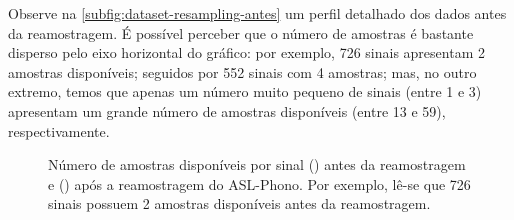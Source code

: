 Observe na \autoref{subfig:dataset-resampling-antes} um perfil detalhado dos dados antes da reamostragem. É possível perceber que o número de amostras é bastante disperso pelo eixo horizontal do gráfico: por exemplo, 726 sinais apresentam 2 amostras disponíveis; seguidos por 552 sinais com 4 amostras; mas, no outro extremo, temos que apenas um número muito pequeno de sinais (entre 1 e 3) apresentam um grande número de amostras disponíveis (entre 13 e 59), respectivamente.

\begin{figure}[ht!]
    \centering
    \caption{
        \textmd{Número de amostras disponíveis por sinal () antes da reamostragem e () após a reamostragem do ASL-Phono. Por exemplo, lê-se que 726 sinais possuem 2 amostras disponíveis antes da reamostragem.}
    }
    \hspace{1cm}
    \nomefonte{}
    \label{fig:dataset-resampling}
\end{figure}

